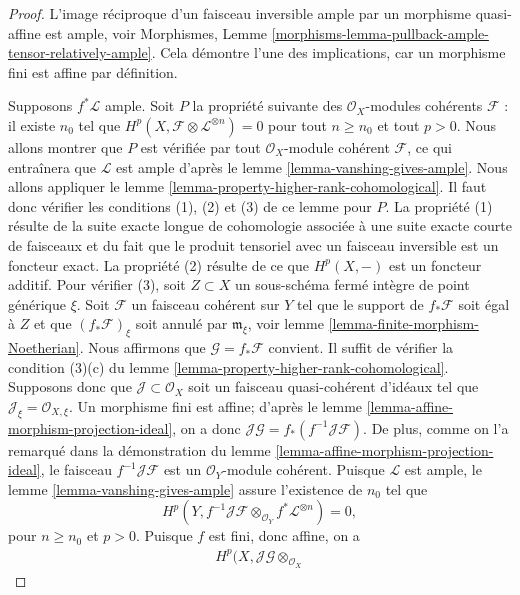 \begin{proof}
L'image réciproque d'un faisceau inversible ample par un morphisme quasi-affine
est ample, voir Morphismes, Lemme
\ref{morphisms-lemma-pullback-ample-tensor-relatively-ample}.
Cela démontre l'une des implications, car un morphisme fini est affine
par définition.

\medskip\noindent
Supposons $f^*\mathcal{L}$ ample. Soit $P$ la propriété suivante
des $\mathcal{O}_X$-modules cohérents $\mathcal{F}$ : il existe $n_0$
tel que $H^p(X, \mathcal{F} \otimes \mathcal{L}^{\otimes n}) = 0$
pour tout $n \geq n_0$ et tout $p > 0$. Nous allons montrer que $P$ est
vérifiée par tout $\mathcal{O}_X$-module cohérent $\mathcal{F}$, ce qui entraînera que
$\mathcal{L}$ est ample d'après le lemme \ref{lemma-vanshing-gives-ample}.
Nous allons appliquer le lemme \ref{lemma-property-higher-rank-cohomological}.
Il faut donc vérifier les conditions (1), (2) et (3) de ce lemme pour $P$.
La propriété (1) résulte de la suite exacte longue de cohomologie associée
à une suite exacte courte de faisceaux et du fait que le produit tensoriel avec un
faisceau inversible est un foncteur exact. La propriété (2) résulte de ce que
$H^p(X, -)$ est un foncteur additif. Pour vérifier (3), soit $Z \subset X$ un
sous-schéma fermé intègre de point générique $\xi$.
Soit $\mathcal{F}$ un faisceau cohérent sur $Y$ tel que
le support de $f_*\mathcal{F}$ soit égal à $Z$
et que $(f_*\mathcal{F})_\xi$ soit annulé par $\mathfrak m_\xi$,
voir lemme \ref{lemma-finite-morphism-Noetherian}. Nous affirmons
que $\mathcal{G} = f_*\mathcal{F}$ convient. Il suffit de vérifier la
condition (3)(c) du lemme \ref{lemma-property-higher-rank-cohomological}.
Supposons donc que $\mathcal{J} \subset \mathcal{O}_X$ soit un
faisceau quasi-cohérent d'idéaux tel que
$\mathcal{J}_\xi = \mathcal{O}_{X, \xi}$.
Un morphisme fini est affine; d'après le
lemme \ref{lemma-affine-morphism-projection-ideal}, on a donc
$\mathcal{J}\mathcal{G} = f_*(f^{-1}\mathcal{J}\mathcal{F})$.
De plus, comme on l'a remarqué dans la démonstration du
lemme \ref{lemma-affine-morphism-projection-ideal}, le faisceau
$f^{-1}\mathcal{J}\mathcal{F}$ est un $\mathcal{O}_Y$-module cohérent.
Puisque $\mathcal{L}$ est ample, le lemme \ref{lemma-vanshing-gives-ample}
assure l'existence de $n_0$ tel que
$$
H^p(Y, f^{-1}\mathcal{J}\mathcal{F}
\otimes_{\mathcal{O}_Y} f^*\mathcal{L}^{\otimes n}) = 0,
$$
pour $n \geq n_0$ et $p > 0$. Puisque $f$ est fini, donc affine, on a
\begin{align*}
H^p(X, \mathcal{J}\mathcal{G} \otimes_{\mathcal{O}_X}

\end{align*}
\end{proof}
